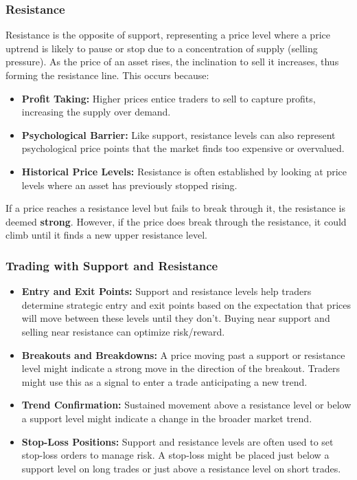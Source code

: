 \documentclass{report}
\begin{document}
    \subsubsection{Resistance}
    \bigbreak \noindent 
    Resistance is the opposite of support, representing a price level where a price uptrend is likely to pause or stop due to a concentration of supply (selling pressure). As the price of an asset rises, the inclination to sell it increases, thus forming the resistance line. This occurs because:
    \begin{itemize}
        \item \textbf{Profit Taking:} Higher prices entice traders to sell to capture profits, increasing the supply over demand.
        \item \textbf{Psychological Barrier:} Like support, resistance levels can also represent psychological price points that the market finds too expensive or overvalued.
        \item \textbf{Historical Price Levels:} Resistance is often established by looking at price levels where an asset has previously stopped rising.
    \end{itemize}
    \bigbreak \noindent 
    If a price reaches a resistance level but fails to break through it, the resistance is deemed \textbf{strong}. However, if the price does break through the resistance, it could climb until it finds a new upper resistance level.
    \bigbreak \noindent 
    \subsubsection{Trading with Support and Resistance}
    \begin{itemize}
        \item \textbf{Entry and Exit Points:} Support and resistance levels help traders determine strategic entry and exit points based on the expectation that prices will move between these levels until they don't. Buying near support and selling near resistance can optimize risk/reward.
        \item \textbf{Breakouts and Breakdowns:} A price moving past a support or resistance level might indicate a strong move in the direction of the breakout. Traders might use this as a signal to enter a trade anticipating a new trend.
        \item \textbf{Trend Confirmation:} Sustained movement above a resistance level or below a support level might indicate a change in the broader market trend.
        \item \textbf{Stop-Loss Positions:} Support and resistance levels are often used to set stop-loss orders to manage risk. A stop-loss might be placed just below a support level on long trades or just above a resistance level on short trades.
    \end{itemize}
\end{document}
